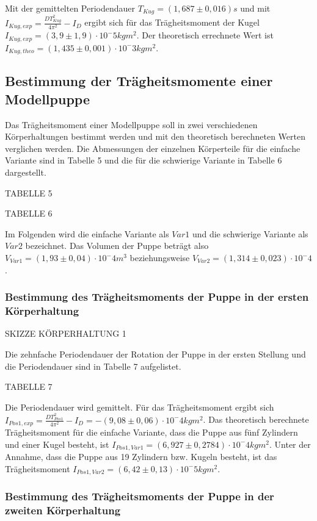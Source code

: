     Mit der gemittelten Periodendauer $T_{Kug} = (1,687 \pm 0,016) s$ und mit $I_{Kug,exp} = \frac{DT_{Kug}^2}{4\pi^2} - I_D$
    ergibt sich für das Trägheitsmoment der Kugel $I_{Kug,exp} = (3,9 \pm 1,9) \cdot 10^-5 kg m^2$.
    Der theoretisch errechnete Wert ist $I_{Kug,theo} = (1,435 \pm 0,001) \cdot 10^-3 kg m^2$.

    \subsection{Bestimmung der Trägheitsmomente einer Modellpuppe}
    Das Trägheitsmoment einer Modellpuppe soll in zwei verschiedenen
    Körperhaltungen bestimmt werden und mit den theoretisch berechneten
    Werten verglichen werden.
    Die Abmessungen der einzelnen Körperteile für die einfache Variante
    sind in Tabelle 5 und die für die schwierige Variante in Tabelle 6 dargestellt.

    TABELLE 5

    TABELLE 6

    Im Folgenden wird die einfache Variante als $Var1$ und die schwierige Variante als $Var2$ bezeichnet.
    Das Volumen der Puppe beträgt also $V_{Var1} = (1,93 \pm 0,04) \cdot 10^-4 m^3$ 
    beziehungsweise $V_{Var2} = (1,314 \pm 0,023) \cdot 10^-4 $.

    \subsubsection{Bestimmung des Trägheitsmoments der Puppe in der ersten Körperhaltung}

    SKIZZE KÖRPERHALTUNG 1

    Die zehnfache Periodendauer der Rotation der Puppe in der ersten Stellung
    und die Periodendauer sind in Tabelle 7 aufgelistet.

    TABELLE 7

    Die Periodendauer wird gemittelt. Für das Trägheitsmoment ergibt sich
    $I_{Pos1,exp} = \frac{DT_{Pos1}^2}{4\pi^2} - I_D = -(9,08 \pm 0,06) \cdot 10^-4 kg m^2$.
    Das theoretisch berechnete Trägheitsmoment für die einfache
    Variante, dass die Puppe aus fünf Zylindern und einer Kugel besteht,
    ist $I_{Pos1,Var1} = (6,927 \pm 0,2784) \cdot 10^-4 kg m^2$.
    Unter der Annahme, dass die Puppe aus 19 Zylindern bzw. Kugeln
    besteht, ist das Trägheitsmoment $I_{Pos1,Var2} = (6,42 \pm 0,13) \cdot 10^-5 kg m^2$.

    \subsubsection{Bestimmung des Trägheitsmoments der Puppe in der zweiten Körperhaltung}

